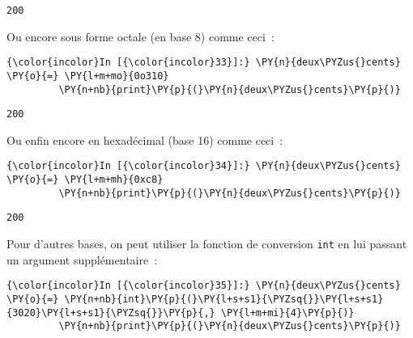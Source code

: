     \begin{Verbatim}[commandchars=\\\{\},frame=single,framerule=0.3mm,rulecolor=\color{cellframecolor}]
200
\end{Verbatim}

    Ou encore sous forme octale (en base 8) comme ceci~:

    \begin{Verbatim}[commandchars=\\\{\},frame=single,framerule=0.3mm,rulecolor=\color{cellframecolor}]
{\color{incolor}In [{\color{incolor}33}]:} \PY{n}{deux\PYZus{}cents} \PY{o}{=} \PY{l+m+mo}{0o310}
         \PY{n+nb}{print}\PY{p}{(}\PY{n}{deux\PYZus{}cents}\PY{p}{)}
\end{Verbatim}


    \begin{Verbatim}[commandchars=\\\{\},frame=single,framerule=0.3mm,rulecolor=\color{cellframecolor}]
200
\end{Verbatim}

    Ou enfin encore en hexadécimal (base 16) comme ceci~:

    \begin{Verbatim}[commandchars=\\\{\},frame=single,framerule=0.3mm,rulecolor=\color{cellframecolor}]
{\color{incolor}In [{\color{incolor}34}]:} \PY{n}{deux\PYZus{}cents} \PY{o}{=} \PY{l+m+mh}{0xc8}
         \PY{n+nb}{print}\PY{p}{(}\PY{n}{deux\PYZus{}cents}\PY{p}{)}
\end{Verbatim}


    \begin{Verbatim}[commandchars=\\\{\},frame=single,framerule=0.3mm,rulecolor=\color{cellframecolor}]
200
\end{Verbatim}

    Pour d'autres bases, on peut utiliser la fonction de conversion
\texttt{int} en lui passant un argument supplémentaire~:

    \begin{Verbatim}[commandchars=\\\{\},frame=single,framerule=0.3mm,rulecolor=\color{cellframecolor}]
{\color{incolor}In [{\color{incolor}35}]:} \PY{n}{deux\PYZus{}cents} \PY{o}{=} \PY{n+nb}{int}\PY{p}{(}\PY{l+s+s1}{\PYZsq{}}\PY{l+s+s1}{3020}\PY{l+s+s1}{\PYZsq{}}\PY{p}{,} \PY{l+m+mi}{4}\PY{p}{)}
         \PY{n+nb}{print}\PY{p}{(}\PY{n}{deux\PYZus{}cents}\PY{p}{)}
\end{Verbatim}


